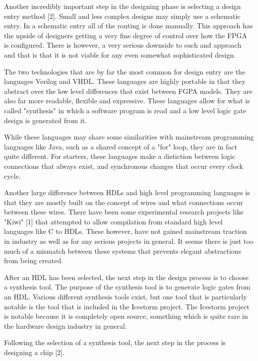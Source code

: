 \documentclass{article}
\begin{document}
    Another incredibly important step in the designing phase is selecting a design
    entry method [2]. Small and less complex designs may simply use a schematic entry.
    In a schematic entry all of the routing is done manually.
    This approach has the upside of designers getting a very fine degree of control over
    how the FPGA is configured.
    There is however, a very serious downside to such and approach and that is that it
    is not viable for any even somewhat sophisticated design.

    The two technologies that are by far the most common for design entry are the languages
    Verilog and VHDL. These languages are highly portable in that they abstract
    over the low level differences that exist between FGPA models.
    They are also far more readable, flexible and expressive. These languages
    allow for what is called "synthesis" in which a software program is read
    and a low level logic gate design is generated from it.

    While these languages may share some similarities with mainstream programming languages
    like Java, such as a shared concept of a "for" loop, they are in fact quite different.
    For starters, these languages make a distiction between logic connections that
    always exist, and synchronous changes that occur every clock cycle.

    Another large difference between HDLs and high level programming languages is that
    they are mostly built on the concept of wires and what connections occur between these
    wires. There have been some experimental research projects like "Kiwi" [1] that
    attempted to allow compilation from standard high level languages like C to HDLs.
    These however, have not gained mainstream traction in industry as well as for any serious
    projects in general. It seems there is just too much of a mismatch between
    these systems that prevents elegant abstractions from being created.

    After an HDL has been selected, the next step in the design process is to choose a
    synthesis tool. The purpose of the synthesis tool is to generate logic gates
    from an HDL. Various different synthesis tools exist, but one tool that
    is particularly notable is the tool that is included in the Icestorm project.
    The Icestorm project is notable because it is completely open source, something
    which is quite rare in the hardware design industry in general.

    Following the selection of a synthesis tool, the next step in the process
    is designing a chip [2].
\end{document}
